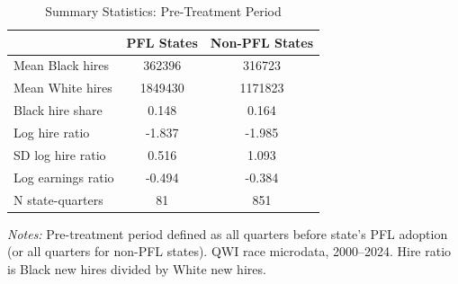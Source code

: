 \begin{table}[htbp]
\centering
\caption{Summary Statistics: Pre-Treatment Period}
\label{tab:summary}
\begin{threeparttable}
\begin{tabular}{lcc}
\hline\hline
 & PFL States & Non-PFL States \\
\hline
Mean Black hires & 362396 & 316723 \\
Mean White hires & 1849430 & 1171823 \\
Black hire share & 0.148 & 0.164 \\
Log hire ratio & -1.837 & -1.985 \\
SD log hire ratio & 0.516 & 1.093 \\
Log earnings ratio & -0.494 & -0.384 \\
N state-quarters & 81 & 851 \\
\hline\hline
\end{tabular}
\begin{tablenotes}[flushleft]\footnotesize
\item \textit{Notes:} Pre-treatment period defined as all quarters before state's PFL adoption (or all quarters for non-PFL states). QWI race microdata, 2000--2024. Hire ratio is Black new hires divided by White new hires.
\end{tablenotes}
\end{threeparttable}
\end{table}
